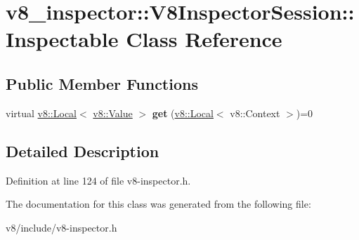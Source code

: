 \hypertarget{classv8__inspector_1_1V8InspectorSession_1_1Inspectable}{}\section{v8\+\_\+inspector\+:\+:V8\+Inspector\+Session\+:\+:Inspectable Class Reference}
\label{classv8__inspector_1_1V8InspectorSession_1_1Inspectable}
\subsection*{Public Member Functions}
\begin{DoxyCompactItemize}
\item 
\mbox{\label{classv8__inspector_1_1V8InspectorSession_1_1Inspectable_ad7811abdabae6f826f98150f621cee63}} 
virtual \mbox{\hyperlink{classv8_1_1Local}{v8\+::\+Local}}$<$ \mbox{\hyperlink{classv8_1_1Value}{v8\+::\+Value}} $>$ {\bfseries get} (\mbox{\hyperlink{classv8_1_1Local}{v8\+::\+Local}}$<$ v8\+::\+Context $>$)=0
\end{DoxyCompactItemize}


\subsection{Detailed Description}


Definition at line 124 of file v8-\/inspector.\+h.



The documentation for this class was generated from the following file\+:\begin{DoxyCompactItemize}
\item 
v8/include/v8-\/inspector.\+h\end{DoxyCompactItemize}
